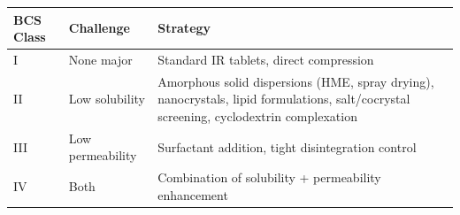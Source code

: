 \documentclass[
  11pt,
  a4paper,
]{report}
\begin{document}
\begin{longtable}[]{@{}lll@{}}
\toprule
\begin{minipage}[b]{0.31\columnwidth}\raggedright
BCS Class\strut
\end{minipage} & \begin{minipage}[b]{0.31\columnwidth}\raggedright
Challenge\strut
\end{minipage} & \begin{minipage}[b]{0.29\columnwidth}\raggedright
Strategy\strut
\end{minipage}\tabularnewline
\midrule
\endhead
\begin{minipage}[t]{0.31\columnwidth}\raggedright
I\strut
\end{minipage} & \begin{minipage}[t]{0.31\columnwidth}\raggedright
None major\strut
\end{minipage} & \begin{minipage}[t]{0.29\columnwidth}\raggedright
Standard IR tablets, direct compression\strut
\end{minipage}\tabularnewline
\begin{minipage}[t]{0.31\columnwidth}\raggedright
II\strut
\end{minipage} & \begin{minipage}[t]{0.31\columnwidth}\raggedright
Low solubility\strut
\end{minipage} & \begin{minipage}[t]{0.29\columnwidth}\raggedright
Amorphous solid dispersions (HME, spray drying), nanocrystals, lipid
formulations, salt/cocrystal screening, cyclodextrin complexation\strut
\end{minipage}\tabularnewline
\begin{minipage}[t]{0.31\columnwidth}\raggedright
III\strut
\end{minipage} & \begin{minipage}[t]{0.31\columnwidth}\raggedright
Low permeability\strut
\end{minipage} & \begin{minipage}[t]{0.29\columnwidth}\raggedright
Surfactant addition, tight disintegration control\strut
\end{minipage}\tabularnewline
\begin{minipage}[t]{0.31\columnwidth}\raggedright
IV\strut
\end{minipage} & \begin{minipage}[t]{0.31\columnwidth}\raggedright
Both\strut
\end{minipage} & \begin{minipage}[t]{0.29\columnwidth}\raggedright
Combination of solubility + permeability enhancement\strut
\end{minipage}\tabularnewline
\bottomrule
\end{longtable}
\end{document}
